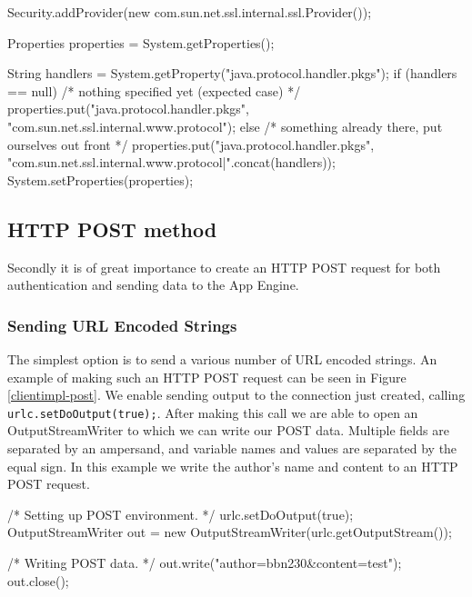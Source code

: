 \begin{figure*}[ht] %
\begin{center}
\begin{code}
Security.addProvider(new com.sun.net.ssl.internal.ssl.Provider());

Properties properties = System.getProperties();

String handlers = System.getProperty("java.protocol.handler.pkgs");
if (handlers == null) {
    /* nothing specified yet (expected case) */
    properties.put("java.protocol.handler.pkgs",
        "com.sun.net.ssl.internal.www.protocol");
} 
else {
    /* something already there, put ourselves out front */
    properties.put("java.protocol.handler.pkgs",
        "com.sun.net.ssl.internal.www.protocol|".concat(handlers));
}
System.setProperties(properties);
\end{code}
\caption{Opening an HTTP Connection.\label{clientimpl-https}}
\end{center}
\end{figure*}

\subsection{HTTP POST method}
Secondly it is of great importance to create an HTTP POST request for both
authentication and sending data to the App Engine.

\subsubsection{Sending URL Encoded Strings}
The simplest option is to send a various number of URL encoded strings. An
example of making such an HTTP POST request can be seen in Figure
\ref{clientimpl-post}. We enable sending output to the connection just created,
calling \texttt{urlc.setDoOutput(true);}. After making this call we are able to
open an OutputStreamWriter to which we can write our POST data. Multiple fields are
separated by an ampersand, and variable names and values are separated by the
equal sign. In this example we write the author's name and content to an HTTP
POST request.

\begin{figure*}[ht] %
\begin{center}
\begin{code}
/* Setting up POST environment. */
urlc.setDoOutput(true);
OutputStreamWriter out = new OutputStreamWriter(urlc.getOutputStream());

/* Writing POST data. */
out.write("author=bbn230&content=test");
out.close();
\end{code}
\caption{Making an HTTP POST request.\label{clientimpl-post}}
\end{center}
\end{figure*}

